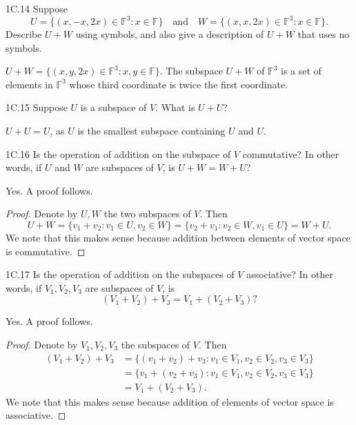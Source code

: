 \documentclass{exam}
\begin{document}
\begin{problem}{1C.14}
    Suppose $$U=\{(x, -x, 2x)\in\mathbb F^3:x\in\mathbb F\}\quad\text{and}\quad W=\{(x, x, 2x)\in\mathbb F^3:x\in\mathbb F\}.$$ Describe $U+W$ using symbols, and also give a description of $U+W$ that uses no symbols.
\end{problem}

$U+W = \{(x, y, 2x)\in\mathbb F^3: x, y\in\mathbb F\}$. The subspace $U+W$ of $\mathbb F^3$ is a set of elements in $\mathbb F^3$ whose third coordinate is twice the first coordinate.

\begin{problem}{1C.15}
    Suppose $U$ is a subspace of $V$. What is $U + U$?
\end{problem}

$U + U = U$, as $U$ is the smallest subspace containing $U$ and $U$.

\begin{problem}{1C.16}
    Is the operation of addition on the subspace of $V$ commutative? In other words, if $U$ and $W$ are subspaces of $V$, is $U + W = W + U$?
\end{problem}

Yes. A proof follows.
\begin{proof}
    Denote by $U, W$ the two subspaces of $V$. Then \[
        U + W = \{v_1 + v_2:v_1\in U, v_2\in W\} = \{v_2 + v_1:v_2\in W, v_1\in U\} = W + U.
    \]
    We note that this makes sense because addition between elements of vector space is commutative.
\end{proof}

\begin{problem}{1C.17}
    Is the operation of addition on the subspaces of $V$ associative? In other words, if $V_1, V_2, V_3$ are subspaces of $V$, is \[
        (V_1 + V_2) + V_3 = V_1 + (V_2 + V_3)?
    \]
\end{problem}

Yes. A proof follows.
\begin{proof}
    Denote by $V_1, V_2, V_3$ the subspaces of $V$. Then
    \begin{align*}
        (V_1 + V_2) + V_3 &= \{(v_1 + v_2) + v_3: v_1\in V_1, v_2\in V_2, v_3\in V_3\}\\
        &= \{v_1 + (v_2 + v_3): v_1\in V_1, v_2\in V_2, v_3\in V_3\}\\
        &= V_1 + (V_2 + V_3).
    \end{align*}
    We note that this makes sense because addition of elements of vector space is associative.
\end{proof}
\end{document}
